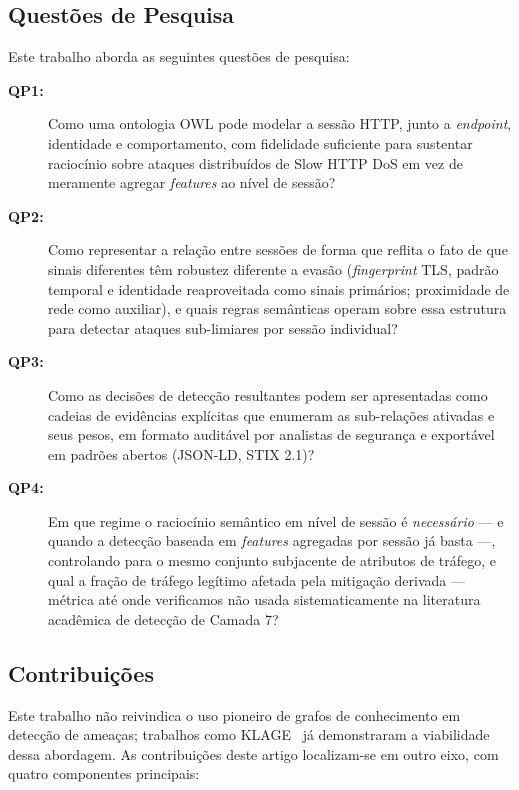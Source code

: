 \documentclass[preprint,12pt]{elsarticle}
\begin{document}
\subsection{Questões de Pesquisa}

Este trabalho aborda as seguintes questões de pesquisa:

\begin{description}
    \item[\textbf{QP1:}] Como uma ontologia OWL pode modelar a sessão HTTP, junto a \emph{endpoint}, identidade e comportamento, com fidelidade suficiente para sustentar raciocínio sobre ataques distribuídos de Slow HTTP DoS em vez de meramente agregar \emph{features} ao nível de sessão?
    \item[\textbf{QP2:}] Como representar a relação entre sessões de forma que reflita o fato de que sinais diferentes têm robustez diferente a evasão (\emph{fingerprint} TLS, padrão temporal e identidade reaproveitada como sinais primários; proximidade de rede como auxiliar), e quais regras semânticas operam sobre essa estrutura para detectar ataques sub-limiares por sessão individual?
    \item[\textbf{QP3:}] Como as decisões de detecção resultantes podem ser apresentadas como cadeias de evidências explícitas que enumeram as sub-relações ativadas e seus pesos, em formato auditável por analistas de segurança e exportável em padrões abertos (JSON-LD, STIX 2.1)?
    \item[\textbf{QP4:}] Em que regime o raciocínio semântico em nível de sessão é \emph{necessário} --- e quando a detecção baseada em \emph{features} agregadas por sessão já basta ---, controlando para o mesmo conjunto subjacente de atributos de tráfego, e qual a fração de tráfego legítimo afetada pela mitigação derivada --- métrica até onde verificamos não usada sistematicamente na literatura acadêmica de detecção de Camada 7?
\end{description}

\subsection{Contribuições}

Este trabalho não reivindica o uso pioneiro de grafos de conhecimento em detecção de ameaças; trabalhos como KLAGE~\cite{belcastro2025klage} já demonstraram a viabilidade dessa abordagem. As contribuições deste artigo localizam-se em outro eixo, com quatro componentes principais:
\end{document}
